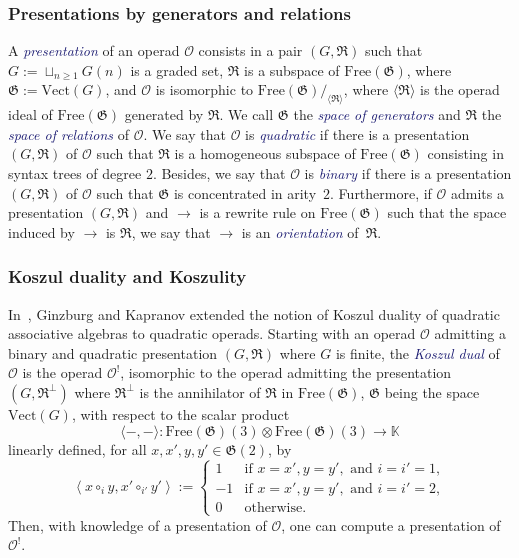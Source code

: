 \documentclass[10pt,reqno]{amsart}
\numberwithin{equation}{subsection}
\renewcommand{\geq}{\geqslant}
\newcommand{\K}{\mathbb{K}}
\newcommand{\Oca}{\mathcal{O}}
\newcommand{\Vect}{\mathrm{Vect}}
\newcommand{\Rew}{\to}
\newcommand{\Free}{\mathrm{Free}}
\newcommand{\Gen}{\mathfrak{G}}
\newcommand{\Rel}{\mathfrak{R}}
\newcommand{\Def}[1]{\textcolor{MidnightBlue}{\em #1}}
\begin{document}
\subsubsection{Presentations by generators and relations}
A \Def{presentation} of an operad $\Oca$ consists in a pair $(G, \Rel)$
such that $G := \sqcup_{n \geq 1} G(n)$ is a graded set, $\Rel$ is a
subspace of $\Free(\Gen)$, where $\Gen := \Vect(G)$, and $\Oca$ is
isomorphic to $\Free(\Gen)/_{\langle \Rel \rangle}$,  where
$\langle \Rel \rangle$ is the operad ideal of $\Free(\Gen)$ generated by
$\Rel$. We call $\Gen$ the \Def{space of generators} and $\Rel$ the
\Def{space of relations} of $\Oca$. We say that $\Oca$ is \Def{quadratic}
if there is a presentation $(G, \Rel)$ of $\Oca$ such that $\Rel$ is a
homogeneous subspace of $\Free(\Gen)$ consisting in syntax trees of
degree $2$. Besides, we say that $\Oca$ is \Def{binary} if there is a
presentation $(G, \Rel)$ of $\Oca$ such that $\Gen$ is concentrated in
arity~$2$. Furthermore, if $\Oca$ admits a presentation $(G, \Rel)$ and
$\Rew$ is a rewrite rule on $\Free(\Gen)$ such that the space induced by
$\Rew$ is $\Rel$, we say that $\Rew$ is an \Def{orientation} of~$\Rel$.
\medskip

\subsubsection{Koszul duality and Koszulity}%
\label{subsubsec:koszul_duality_koszulity_criterion}
In~\cite{GK94}, Ginzburg and Kapranov extended the notion of Koszul
duality of quadratic associative algebras to quadratic operads. Starting
with an operad $\Oca$ admitting a binary and quadratic presentation
$(G, \Rel)$ where $G$ is finite, the \Def{Koszul dual} of $\Oca$ is the
operad $\Oca^!$, isomorphic to the operad admitting the presentation
$\left(G, \Rel^\perp\right)$ where $\Rel^\perp$ is the annihilator of
$\Rel$ in $\Free(\Gen)$, $\Gen$ being the space $\Vect(G)$, with respect
to the scalar product
\begin{equation}
    \langle -, - \rangle :
    \Free(\Gen)(3) \otimes \Free(\Gen)(3) \to \K
\end{equation}
linearly defined, for all $x, x', y, y' \in \Gen(2)$, by
\begin{equation} \label{equ:scalar_product_koszul}
    \left\langle x \circ_i y, x' \circ_{i'} y' \right\rangle :=
    \begin{cases}
        1 & \mbox{if }
            x = x', y = y', \mbox{ and } i = i' = 1, \\
        -1 & \mbox{if }
            x = x', y = y', \mbox{ and } i = i' = 2, \\
        0 & \mbox{otherwise}.
    \end{cases}
\end{equation}
Then, with knowledge of a presentation of $\Oca$, one can compute a
presentation of~$\Oca^!$.
\medskip
\end{document}

